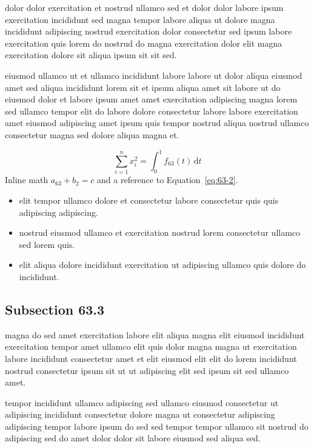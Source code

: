 \documentclass{article}
\begin{document}
dolor dolor exercitation et nostrud ullamco sed et dolor dolor labore ipsum exercitation incididunt sed magna tempor labore aliqua ut dolore magna incididunt adipiscing nostrud exercitation dolor consectetur sed ipsum labore exercitation quis lorem do nostrud do magna exercitation dolor elit magna exercitation dolore sit aliqua ipsum sit sit sed.

eiusmod ullamco ut et ullamco incididunt labore labore ut dolor aliqua eiusmod amet sed aliqua incididunt lorem sit et ipsum aliqua amet sit labore ut do eiusmod dolor et labore ipsum amet amet exercitation adipiscing magna lorem sed ullamco tempor elit do labore dolore consectetur labore labore exercitation amet eiusmod adipiscing amet ipsum quis tempor nostrud aliqua nostrud ullamco consectetur magna sed dolore aliqua magna et.

\begin{equation}\label{eq:63-2}
  \sum_{i=1}^{n} x_i^{2} = \int_0^1 f_{63}(t)\,\mathrm{d}t
\end{equation}
Inline math $a_{63} + b_{2} = c$ and a reference to Equation~\eqref{eq:63-2}.

\begin{itemize}
  \item elit tempor ullamco dolore et consectetur labore consectetur quis quis adipiscing adipiscing.
  \item nostrud eiusmod ullamco et exercitation nostrud lorem consectetur ullamco sed lorem quis.
  \item elit aliqua dolore incididunt exercitation ut adipiscing ullamco quis dolore do incididunt.
\end{itemize}

\subsection{Subsection 63.3}\label{sec:63-3}
magna do sed amet exercitation labore elit aliqua magna elit eiusmod incididunt exercitation tempor amet ullamco elit quis dolor magna magna ut exercitation labore incididunt consectetur amet et elit eiusmod elit elit do lorem incididunt nostrud consectetur ipsum sit ut ut adipiscing elit sed ipsum sit sed ullamco amet.

tempor incididunt ullamco adipiscing sed ullamco eiusmod consectetur ut adipiscing incididunt consectetur dolore magna ut consectetur adipiscing adipiscing tempor labore ipsum do sed sed tempor tempor ullamco sit nostrud do adipiscing sed do amet dolor dolor sit labore eiusmod sed aliqua sed.
\end{document}
